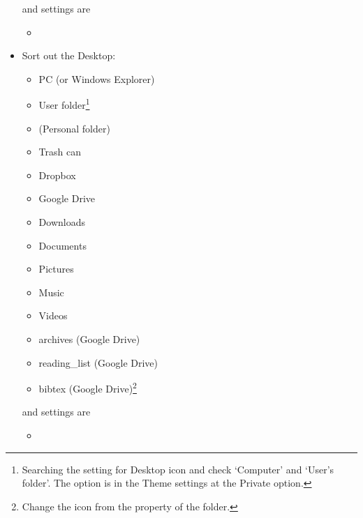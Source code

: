 \documentclass[a4paper,pdftex]{article}
\begin{document}
\begin{itemize}
  and settings are
  \begin{itemize}
    \item 




  \end{itemize}

  \item 
  Sort out the Desktop:
  \begin{itemize}
    \item 
    PC (or Windows Explorer)

    \item 
    User folder\footnote{Searching the setting for Desktop icon and check `Computer' and `User's folder'. The option is in the Theme settings at the Private option.}

    \item 
    (Personal folder)

    \item 
    Trash can
    
    \item 
    Dropbox

    \item 
    Google Drive

    \item 
    Downloads

    \item 
    Documents

    \item 
    Pictures

    \item 
    Music

    \item 
    Videos

    \item 
    archives (Google Drive)

    \item 
    reading\_list (Google Drive)

    \item 
    bibtex (Google Drive)\footnote{Change the icon from the property of the folder.}
    
  \end{itemize}

  and settings are
  \begin{itemize}
    \item 
    



  \end{itemize}

\end{itemize}
\end{document}
